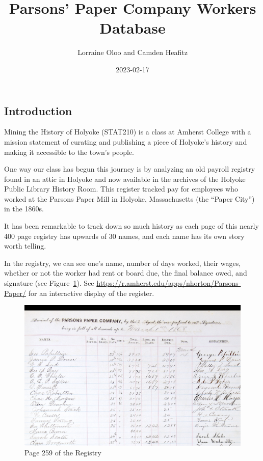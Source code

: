 \documentclass[
  letterpaper,
  DIV=11,
  numbers=noendperiod]{scrartcl}
\title{Parsons' Paper Company Workers Database}
\author{Lorraine Oloo and Camden Heafitz}
\date{2023-02-17}
\begin{document}
\maketitle
\ifdefined\Shaded\renewenvironment{Shaded}{\begin{tcolorbox}[sharp corners, boxrule=0pt, interior hidden, borderline west={3pt}{0pt}{shadecolor}, enhanced, breakable, frame hidden]}{\end{tcolorbox}}\fi

\hypertarget{introduction}{%
\subsection{Introduction}\label{introduction}}

Mining the History of Holyoke (STAT210) is a class at Amherst College
with a mission statement of curating and publishing a piece of Holyoke's
history and making it accessible to the town's people.

One way our class has begun this journey is by analyzing an old payroll
registry found in an attic in Holyoke and now available in the archives
of the Holyoke Public Library History Room. This register tracked pay
for employees who worked at the Parsons Paper Mill in Holyoke,
Massachusetts (the ``Paper City'') in the 1860s.

It has been remarkable to track down so much history as each page of
this nearly 400 page registry has upwards of 30 names, and each name has
its own story worth telling.

In the registry, we can see one's name, number of days worked, their
wages, whether or not the worker had rent or board due, the final
balance owed, and signature (see Figure~\ref{fig-sample}). See
\url{https://r.amherst.edu/apps/nhorton/Parsons-Paper/} for an
interactive display of the register.

\begin{figure}

{\centering \includegraphics[width=\textwidth,height=0.47\textheight]{Registry_page_header.jpeg}

}

\caption{\label{fig-sample}Page 259 of the Registry}

\end{figure}
\end{document}
